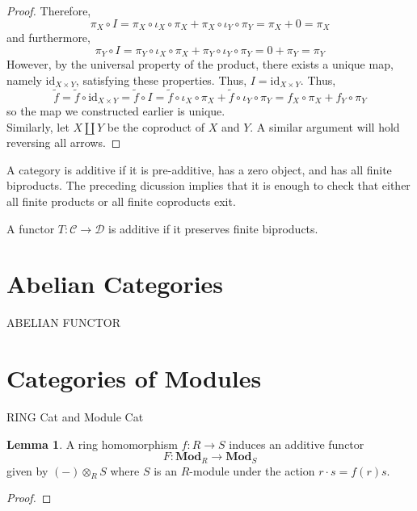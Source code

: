 \documentclass[12pt]{article}
\newcommand{\id}{\mathrm{id}}
\newcommand{\Mod}[1]{\mathbf{Mod}_{#1}}
\newcommand{\C}{\mathcal{C}}
\newcommand{\D}{\mathcal{D}}
\theoremstyle{remark}
\theoremstyle{definition}
\newtheorem{lemma}[theorem]{Lemma}
\newenvironment{definition}[1][Definition:]{\begin{trivlist}
\item[\hskip \labelsep {\bfseries #1}]}{\end{trivlist}}
\begin{document}
\begin{proof}
Therefore, 
\[ \pi_X \circ I = \pi_X \circ \iota_X \circ \pi_X + \pi_X \circ \iota_Y \circ \pi_Y = \pi_X + 0 = \pi_X \]
and furthermore,
\[ \pi_Y \circ I = \pi_Y \circ \iota_X \circ \pi_X + \pi_Y \circ \iota_Y \circ \pi_Y = 0 + \pi_Y = \pi_Y \]
However, by the universal property of the product, there exists a unique map, namely $\id_{X \times Y}$, satisfying these properties. Thus, $I = \id_{X \times Y}$. Thus,
\[ \tilde{f} = \tilde{f} \circ \id_{X \times Y} = \tilde{f} \circ I = \tilde{f} \circ \iota_X \circ \pi_X + \tilde{f} \circ \iota_Y \circ \pi_Y  = f_X \circ \pi_X + f_Y \circ \pi_Y \]
so the map we constructed earlier is unique. 
\bigskip\\
Similarly, let $X \coprod Y$ be the coproduct of $X$ and $Y$. A similar argument will hold reversing all arrows. 
\end{proof}


\begin{definition}
A category is additive if it is pre-additive, has a zero object, and has all finite biproducts. The preceding dicussion implies that it is enough to check that either all finite products or all finite coproducts exit.  
\end{definition}

\begin{definition}
A functor $T : \C \to \D$ is additive if it preserves finite biproducts.  
\end{definition}

\section{Abelian Categories}

ABELIAN FUNCTOR

\section{Categories of Modules}

\begin{definition}
RING Cat and Module Cat
\end{definition}

\begin{lemma}
A ring homomorphism $f : R \to S$ induces an additive functor \[F : \Mod{R} \to \Mod{S}\]
given by $ (-) \otimes_{R} S$ where $S$ is an $R$-module under the action $r \cdot s = f(r)s$. 
\end{lemma}

\begin{proof}

\end{proof}
\end{document}
